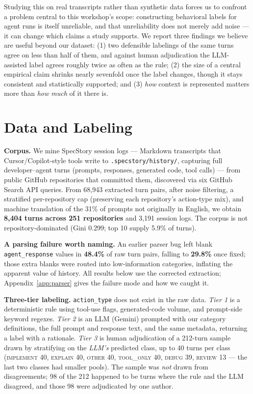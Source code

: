 \documentclass{article}
\begin{document}
Studying this on real transcripts rather than synthetic data forces us to
confront a problem central to this workshop's scope: constructing behavioral
labels for agent runs is itself unreliable, and that unreliability does not
merely add noise --- it can change which claims a study supports. We report
three findings we believe are useful beyond our dataset: (1) two defensible
labelings of the same turns agree on less than half of them, and against human
adjudication the LLM-assisted label agrees roughly twice as often as the rule;
(2) the size of a central empirical claim shrinks nearly sevenfold once the
label changes, though it stays consistent and statistically supported; and (3)
\emph{how} context is represented matters more than \emph{how much} of it there
is.

\section{Data and Labeling}

\textbf{Corpus.} We mine SpecStory session logs --- Markdown transcripts that
Cursor/Copilot-style tools write to \texttt{.specstory/history/}, capturing full
developer--agent turns (prompts, responses, generated code, tool calls) --- from
public GitHub repositories that committed them, discovered via six GitHub Search
API queries. From 68,943 extracted turn pairs, after noise filtering, a
stratified per-repository cap (preserving each repository's action-type mix),
and machine translation of the 31\% of prompts not originally in English, we
obtain \textbf{8,404 turns across 251 repositories} and 3,191 session logs. The
corpus is not repository-dominated (Gini 0.299; top 10 supply 5.9\% of turns).

\textbf{A parsing failure worth naming.} An earlier parser bug left blank
\texttt{agent\_response} values in \textbf{48.4\%} of raw turn pairs, falling to
\textbf{29.8\%} once fixed; those extra blanks were routed into low-information
categories, inflating the apparent value of history. All results below use the
corrected extraction; Appendix~\ref{app:parser} gives the failure mode and how
we caught it.

\textbf{Three-tier labeling.} \texttt{action\_type} does not exist in the raw
data. \emph{Tier 1} is a deterministic rule using tool-use flags,
generated-code volume, and prompt-side keyword regexes. \emph{Tier 2} is an LLM
(Gemini) prompted with our category definitions, the full prompt and response
text, and the same metadata, returning a label with a rationale. \emph{Tier 3}
is human adjudication of a 212-turn sample drawn by stratifying on the
\emph{LLM's} predicted class, up to 40 turns per class (\textsc{implement} 40,
\textsc{explain} 40, \textsc{other} 40, \textsc{tool\_only} 40, \textsc{debug}
39, \textsc{review} 13 --- the last two classes had smaller pools). The sample
was \emph{not} drawn from disagreements; 98 of the 212 happened to be turns
where the rule and the LLM disagreed, and those 98 were adjudicated by one
author.
\end{document}
